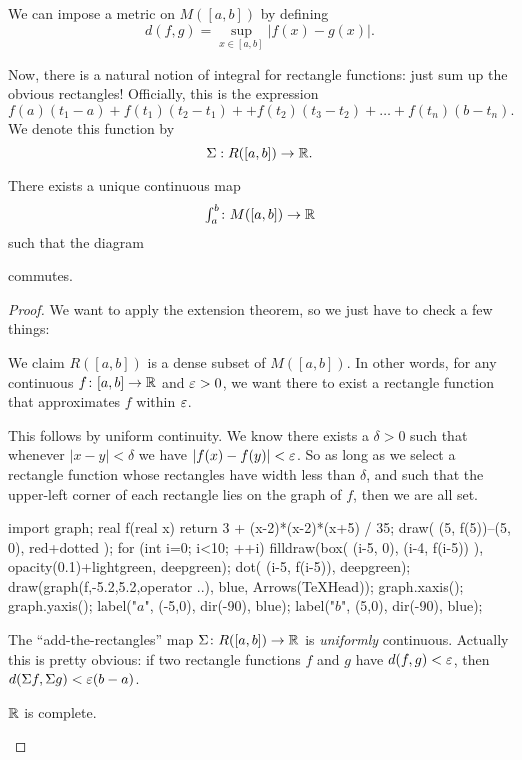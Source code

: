 \begin{definition}
	We can impose a metric on $M([a,b])$
	by defining
	\[ d(f,g) = \sup_{x \in [a,b]} \left\lvert f(x) - g(x) \right\rvert. \]
\end{definition}

Now, there is a natural notion of integral
for rectangle functions: just sum up the obvious rectangles!
Officially, this is the expression
\[ f(a)(t_1-a) + f(t_1)(t_2-t_1) +
	+ f(t_2) \left( t_3 - t_2 \right)
	+ \dots + f(t_n) \left( b - t_n \right).  \]
We denote this function by
\[ \Sigma : R([a,b]) \to \mathbb R. \]

\begin{theorem}
	\label{thm:gaitsgory_riemann}
	There exists a unique continuous map
	\[ \textstyle{\int_a^b} \colon M([a,b]) \to \mathbb R \]
	such that the diagram
	\begin{center}
	\end{center}
	commutes.
\end{theorem}
\begin{proof}
	We want to apply the extension theorem,
	so we just have to check a few things:
	\begin{itemize}
		\ii We claim $R([a,b])$ is a dense subset of $M([a,b])$.
		In other words, for any continuous $f \colon [a,b] \to \mathbb R$
		and $\varepsilon > 0$,
		we want there to exist a rectangle function
		that approximates $f$ within $\varepsilon$.

		This follows by uniform continuity.
		We know there exists a $\delta > 0$ such
		that whenever $|x-y| < \delta$ we have $|f(x)-f(y)| < \varepsilon$.
		So as long as we select a rectangle function
		whose rectangles have width less than $\delta$,
		and such that the upper-left corner of each rectangle
		lies on the graph of $f$, then we are all set. 

		\begin{center}
		\begin{asy}
			import graph;
			real f(real x) { return 3 + (x-2)*(x-2)*(x+5) / 35; }
			draw( (5, f(5))--(5, 0), red+dotted );
			for (int i=0; i<10; ++i) {
				filldraw(box( (i-5, 0), (i-4, f(i-5)) ),
					opacity(0.1)+lightgreen, deepgreen);
				dot( (i-5, f(i-5)), deepgreen);
			}
			draw(graph(f,-5.2,5.2,operator ..), blue, Arrows(TeXHead));
			graph.xaxis();
			graph.yaxis();
			label("$a$", (-5,0), dir(-90), blue);
			label("$b$", (5,0), dir(-90), blue);
		\end{asy}
		\end{center}


		\ii The ``add-the-rectangles'' map $\Sigma \colon R([a,b]) \to \mathbb R$
		is \emph{uniformly} continuous.
		Actually this is pretty obvious:
		if two rectangle functions $f$ and $g$
		have $d(f,g) < \varepsilon$,
		then $d(\Sigma f, \Sigma g) < \varepsilon(b-a)$.

		\ii $\mathbb R$ is complete.\qedhere
	\end{itemize}
\end{proof}


